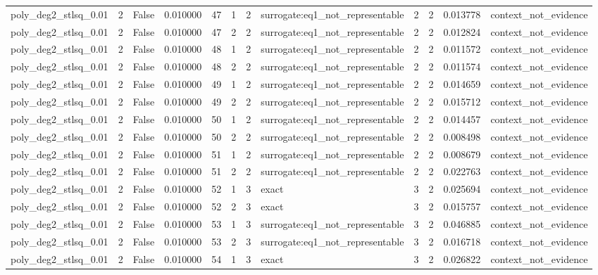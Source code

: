 \begin{tabular}{lrrrrrrlrrrl}
poly\_deg2\_stlsq\_0.01 & 2 & False & 0.010000 & 47 & 1 & 2 & surrogate:eq1\_not\_representable & 2 & 2 & 0.013778 & context\_not\_evidence \\
poly\_deg2\_stlsq\_0.01 & 2 & False & 0.010000 & 47 & 2 & 2 & surrogate:eq1\_not\_representable & 2 & 2 & 0.012824 & context\_not\_evidence \\
poly\_deg2\_stlsq\_0.01 & 2 & False & 0.010000 & 48 & 1 & 2 & surrogate:eq1\_not\_representable & 2 & 2 & 0.011572 & context\_not\_evidence \\
poly\_deg2\_stlsq\_0.01 & 2 & False & 0.010000 & 48 & 2 & 2 & surrogate:eq1\_not\_representable & 2 & 2 & 0.011574 & context\_not\_evidence \\
poly\_deg2\_stlsq\_0.01 & 2 & False & 0.010000 & 49 & 1 & 2 & surrogate:eq1\_not\_representable & 2 & 2 & 0.014659 & context\_not\_evidence \\
poly\_deg2\_stlsq\_0.01 & 2 & False & 0.010000 & 49 & 2 & 2 & surrogate:eq1\_not\_representable & 2 & 2 & 0.015712 & context\_not\_evidence \\
poly\_deg2\_stlsq\_0.01 & 2 & False & 0.010000 & 50 & 1 & 2 & surrogate:eq1\_not\_representable & 2 & 2 & 0.014457 & context\_not\_evidence \\
poly\_deg2\_stlsq\_0.01 & 2 & False & 0.010000 & 50 & 2 & 2 & surrogate:eq1\_not\_representable & 2 & 2 & 0.008498 & context\_not\_evidence \\
poly\_deg2\_stlsq\_0.01 & 2 & False & 0.010000 & 51 & 1 & 2 & surrogate:eq1\_not\_representable & 2 & 2 & 0.008679 & context\_not\_evidence \\
poly\_deg2\_stlsq\_0.01 & 2 & False & 0.010000 & 51 & 2 & 2 & surrogate:eq1\_not\_representable & 2 & 2 & 0.022763 & context\_not\_evidence \\
poly\_deg2\_stlsq\_0.01 & 2 & False & 0.010000 & 52 & 1 & 3 & exact & 3 & 2 & 0.025694 & context\_not\_evidence \\
poly\_deg2\_stlsq\_0.01 & 2 & False & 0.010000 & 52 & 2 & 3 & exact & 3 & 2 & 0.015757 & context\_not\_evidence \\
poly\_deg2\_stlsq\_0.01 & 2 & False & 0.010000 & 53 & 1 & 3 & surrogate:eq1\_not\_representable & 3 & 2 & 0.046885 & context\_not\_evidence \\
poly\_deg2\_stlsq\_0.01 & 2 & False & 0.010000 & 53 & 2 & 3 & surrogate:eq1\_not\_representable & 3 & 2 & 0.016718 & context\_not\_evidence \\
poly\_deg2\_stlsq\_0.01 & 2 & False & 0.010000 & 54 & 1 & 3 & exact & 3 & 2 & 0.026822 & context\_not\_evidence \\

\end{tabular}
